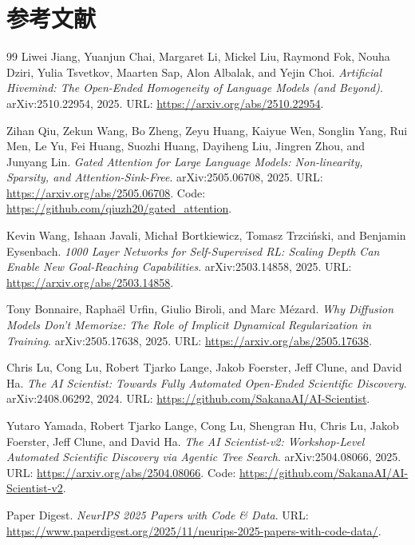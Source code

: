 \documentclass[UTF8,11pt]{ctexart}
\begin{document}
\section*{参考文献}
\begin{thebibliography}{99}
Liwei Jiang, Yuanjun Chai, Margaret Li, Mickel Liu, Raymond Fok, Nouha Dziri, Yulia Tsvetkov, Maarten Sap, Alon Albalak, and Yejin Choi.
\newblock \emph{Artificial Hivemind: The Open-Ended Homogeneity of Language Models (and Beyond)}.
\newblock arXiv:2510.22954, 2025.
\newblock URL: \href{https://arxiv.org/abs/2510.22954}{https://arxiv.org/abs/2510.22954}.

Zihan Qiu, Zekun Wang, Bo Zheng, Zeyu Huang, Kaiyue Wen, Songlin Yang, Rui Men, Le Yu, Fei Huang, Suozhi Huang, Dayiheng Liu, Jingren Zhou, and Junyang Lin.
\newblock \emph{Gated Attention for Large Language Models: Non-linearity, Sparsity, and Attention-Sink-Free}.
\newblock arXiv:2505.06708, 2025.
\newblock URL: \href{https://arxiv.org/abs/2505.06708}{https://arxiv.org/abs/2505.06708}.
\newblock Code: \href{https://github.com/qiuzh20/gated_attention}{https://github.com/qiuzh20/gated_attention}.

Kevin Wang, Ishaan Javali, Michał Bortkiewicz, Tomasz Trzciński, and Benjamin Eysenbach.
\newblock \emph{1000 Layer Networks for Self-Supervised RL: Scaling Depth Can Enable New Goal-Reaching Capabilities}.
\newblock arXiv:2503.14858, 2025.
\newblock URL: \href{https://arxiv.org/abs/2503.14858}{https://arxiv.org/abs/2503.14858}.

Tony Bonnaire, Raphaël Urfin, Giulio Biroli, and Marc Mézard.
\newblock \emph{Why Diffusion Models Don't Memorize: The Role of Implicit Dynamical Regularization in Training}.
\newblock arXiv:2505.17638, 2025.
\newblock URL: \href{https://arxiv.org/abs/2505.17638}{https://arxiv.org/abs/2505.17638}.

Chris Lu, Cong Lu, Robert Tjarko Lange, Jakob Foerster, Jeff Clune, and David Ha.
\newblock \emph{The AI Scientist: Towards Fully Automated Open-Ended Scientific Discovery}.
\newblock arXiv:2408.06292, 2024.
\newblock URL: \href{https://github.com/SakanaAI/AI-Scientist}{https://github.com/SakanaAI/AI-Scientist}.

Yutaro Yamada, Robert Tjarko Lange, Cong Lu, Shengran Hu, Chris Lu, Jakob Foerster, Jeff Clune, and David Ha.
\newblock \emph{The AI Scientist-v2: Workshop-Level Automated Scientific Discovery via Agentic Tree Search}.
\newblock arXiv:2504.08066, 2025.
\newblock URL: \href{https://arxiv.org/abs/2504.08066}{https://arxiv.org/abs/2504.08066}.
\newblock Code: \href{https://github.com/SakanaAI/AI-Scientist-v2}{https://github.com/SakanaAI/AI-Scientist-v2}.

Paper Digest.
\newblock \emph{NeurIPS 2025 Papers with Code \& Data}.
\newblock URL: \href{https://www.paperdigest.org/2025/11/neurips-2025-papers-with-code-data/}{https://www.paperdigest.org/2025/11/neurips-2025-papers-with-code-data/}.
\end{thebibliography}
\end{document}
